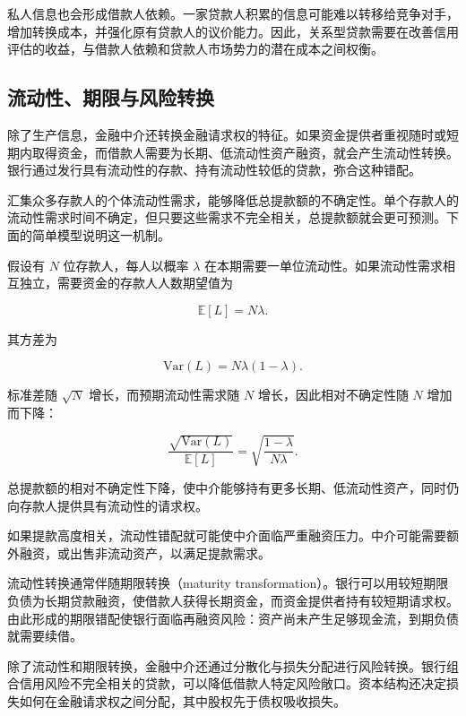 私人信息也会形成借款人依赖。一家贷款人积累的信息可能难以转移给竞争对手，增加转换成本，并强化原有贷款人的议价能力。因此，关系型贷款需要在改善信用评估的收益，与借款人依赖和贷款人市场势力的潜在成本之间权衡。

\subsection{流动性、期限与风险转换}

除了生产信息，金融中介还转换金融请求权的特征。如果资金提供者重视随时或短期内取得资金，而借款人需要为长期、低流动性资产融资，就会产生流动性转换。银行通过发行具有流动性的存款、持有流动性较低的贷款，弥合这种错配。

汇集众多存款人的个体流动性需求，能够降低总提款额的不确定性。单个存款人的流动性需求时间不确定，但只要这些需求不完全相关，总提款额就会更可预测。下面的简单模型说明这一机制。

假设有 $N$ 位存款人，每人以概率 $\lambda$ 在本期需要一单位流动性。如果流动性需求相互独立，需要资金的存款人人数期望值为

\begin{equation}
\mathbb{E}[L]=N\lambda.
\label{eq:ch4-liquidity-expected}
\end{equation}

其方差为

\begin{equation}
\mathrm{Var}(L)=N\lambda(1-\lambda).
\label{eq:ch4-liquidity-variance}
\end{equation}

标准差随 $\sqrt{N}$ 增长，而预期流动性需求随 $N$ 增长，因此相对不确定性随 $N$ 增加而下降：

\begin{equation}
\frac{\sqrt{\mathrm{Var}(L)}}{\mathbb{E}[L]}
=
\sqrt{\frac{1-\lambda}{N\lambda}}.
\label{eq:ch4-liquidity-relative-risk}
\end{equation}

总提款额的相对不确定性下降，使中介能够持有更多长期、低流动性资产，同时仍向存款人提供具有流动性的请求权。

如果提款高度相关，流动性错配就可能使中介面临严重融资压力。中介可能需要额外融资，或出售非流动资产，以满足提款需求。

流动性转换通常伴随期限转换（maturity transformation）。银行可以用较短期限负债为长期贷款融资，使借款人获得长期资金，而资金提供者持有较短期请求权。由此形成的期限错配使银行面临再融资风险：资产尚未产生足够现金流，到期负债就需要续借。

除了流动性和期限转换，金融中介还通过分散化与损失分配进行风险转换。银行组合信用风险不完全相关的贷款，可以降低借款人特定风险敞口。资本结构还决定损失如何在金融请求权之间分配，其中股权先于债权吸收损失。

